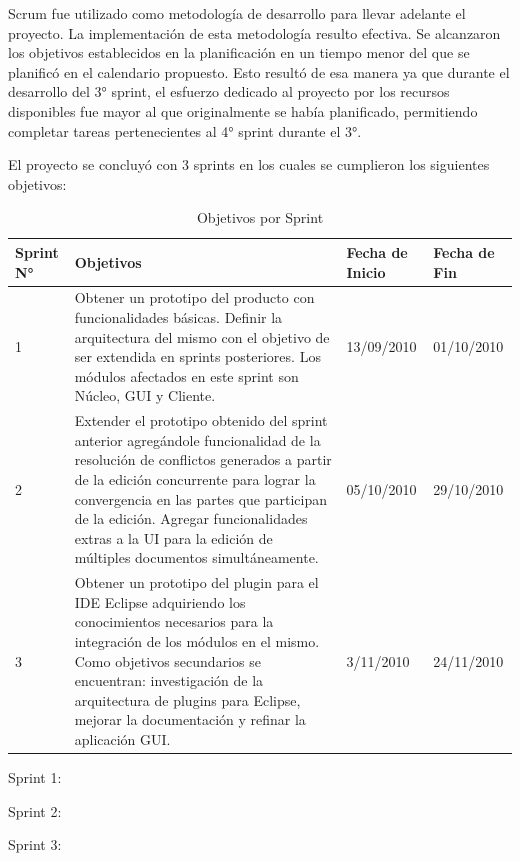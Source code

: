 \documentclass[12pt,a4paper]{article}
\begin{document}
Scrum fue utilizado como metodología de desarrollo para llevar adelante el proyecto. La implementación de esta metodología
resulto efectiva. Se alcanzaron los objetivos establecidos en la planificación en un tiempo menor del que se planificó en
el calendario propuesto. Esto resultó de esa manera ya que durante el desarrollo del 3° sprint, el esfuerzo dedicado al proyecto
por los recursos disponibles fue mayor al que originalmente se había planificado, permitiendo completar tareas pertenecientes
al 4° sprint durante el 3°.

El proyecto se concluyó con 3 sprints en los cuales se cumplieron los siguientes objetivos:

\begin{table}
    \begin{tabular}{ | l | p{6.5cm} | p{2cm} | p{2cm} | }
    \hline
	Sprint N° & Objetivos & Fecha de Inicio & Fecha de Fin \\ \hline

	1 & Obtener un prototipo del producto con funcionalidades básicas. Definir la arquitectura del mismo con el
	objetivo de ser extendida en sprints posteriores. Los módulos afectados en este sprint son Núcleo, GUI y Cliente.
	& 13/09/2010 & 01/10/2010 \\ \hline

	2 & Extender el prototipo obtenido del sprint anterior agregándole funcionalidad de la resolución de conflictos
	generados a partir de la edición concurrente para lograr la convergencia en las partes que participan de la edición.
	Agregar funcionalidades extras a la UI para la edición de múltiples documentos simultáneamente.
	& 05/10/2010 & 29/10/2010 \\ \hline

	3 & Obtener un prototipo del plugin para el IDE Eclipse adquiriendo los conocimientos necesarios para la integración de los
	módulos en el mismo. Como objetivos secundarios se encuentran: investigación de la arquitectura de plugins para Eclipse, mejorar
	la documentación y refinar la aplicación GUI.
	& 3/11/2010 & 24/11/2010 \\ \hline

    \end{tabular}
    \caption{\label{soluciones_comparacion} Objetivos por Sprint}
\end{table}

Sprint 1: 

Sprint 2:

Sprint 3:
\end{document}
